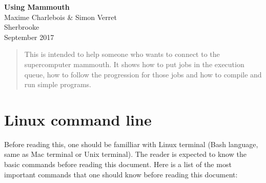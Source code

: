 \documentclass[10pt,letter]{article}
\begin{document}

\begin{centering}

\Large{\textbf{Using Mammouth}}\\
\normalsize{Maxime Charlebois \& Simon Verret}\\
\small{Sherbrooke\\ September 2017}

\end{centering}



\begin{abstract}
This is intended to help someone who wants to connect to the supercomputer mammouth. 
It shows how to put jobs in the execution queue, how to follow the progression for those jobs
and how to compile and run simple programs.
\end{abstract}

\tableofcontents

\renewcommand{\baselinestretch}{1.00}
\setlength{\parskip}{0.8\baselineskip}
\setlength{\parindent}{0mm}


\vspace{2mm}

\section{Linux command line}
Before reading this, one should be familliar with Linux terminal 
(Bash language, same as Mac terminal or Unix terminal). 
The reader is expected to know the basic commands before reading this document. 
Here is a list of the most important commands that one should know before reading this document:
\end{document}
